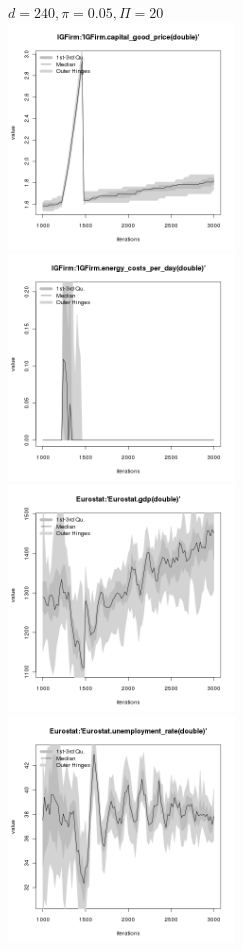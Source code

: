 \begin{figure}[ht!]
\centering\leavevmode
\begin{minipage}{13cm}
\centering\leavevmode
{$d=240, \pi=0.05, \Pi=20$}\\
\includegraphics[width=6cm]{./png/duration_240/intensity_0.05/frequency_20/IGFirm-capital_good_price.png}
\includegraphics[width=6cm]{./png/duration_240/intensity_0.05/frequency_20/IGFirm-energy_costs_per_day.png}
\includegraphics[width=6cm]{./png/duration_240/intensity_0.05/frequency_20/Eurostat-gdp.png}
\includegraphics[width=6cm]{./png/duration_240/intensity_0.05/frequency_20/Eurostat-unemployment_rate.png}
\end{minipage}
\end{figure}

